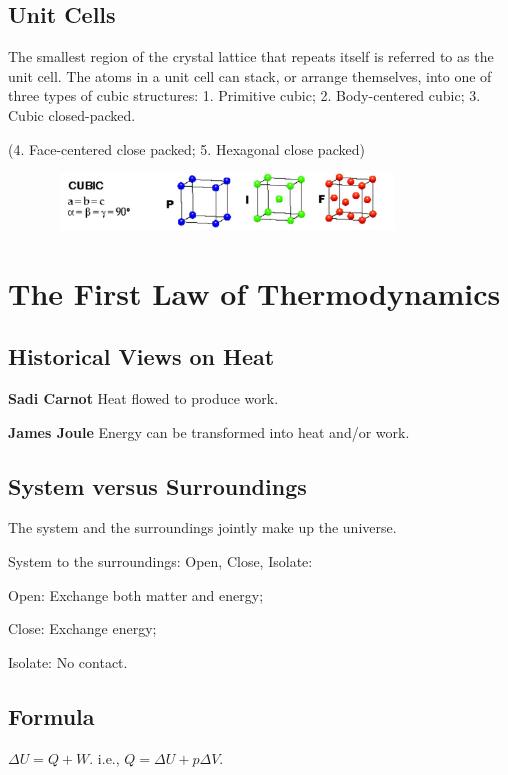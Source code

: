 \documentclass[a4paper,12pt]{article}
\begin{document}
\subsection{Unit Cells}
The smallest region of the crystal lattice that repeats itself is referred to as the unit cell. The atoms in a unit cell can stack,
or arrange themselves, into one of three types of cubic structures: 1. Primitive cubic; 2. Body-centered cubic; 3. Cubic closed-packed.\par
\noindent(4. Face-centered close packed; 5. Hexagonal close packed)
\begin{figure}[b]
\centering
\includegraphics[width=9.5cm,height=1.5cm]{unitcell.png}
\end{figure}


\newpage
\section{The First Law of Thermodynamics}
\subsection{Historical Views on Heat}
\textbf{Sadi Carnot} Heat flowed to produce work.\par
\textbf{James Joule} Energy can be transformed into heat and/or work.\par
\subsection{System versus Surroundings}
The system and the surroundings jointly make up the universe.\par
System to the surroundings: Open, Close, Isolate:\par
Open: Exchange both matter and energy;\par
Close: Exchange energy;\par
Isolate: No contact.
\subsection{Formula}
$\Delta U = Q + W$. i.e., $Q=\Delta U+p\Delta V$.
\end{document}
